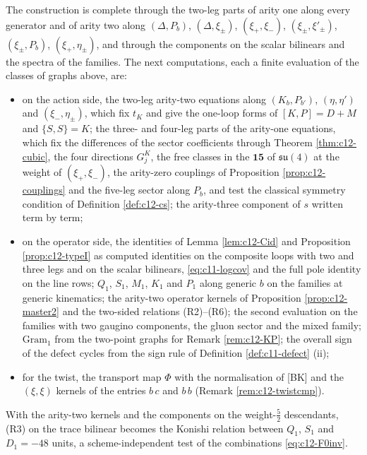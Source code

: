 \begin{remark}
\label{rem:c12-next}
The construction is complete through the two-leg parts of arity one along every generator and of arity two along $(\Delta,P_b)$, $(\Delta,\xi_\pm)$, $(\xi_+,\xi_-)$, $(\xi_\pm,\xi'_\pm)$, $(\xi_\pm,P_b)$, $(\xi_+,\eta_\pm)$, and through the components on the scalar bilinears and the spectra of the families. The next computations, each a finite evaluation of the classes of graphs above, are:
\begin{itemize}
\item on the action side, the two-leg arity-two equations along $(K_b,P_{b'})$, $(\eta,\eta')$ and $(\xi_-,\eta_\pm)$, which fix $t_K$ and give the one-loop forms of $[K,P]=D+M$ and $\{S,S\}=K$; the three- and four-leg parts of the arity-one equations, which fix the differences of the sector coefficients through Theorem \ref{thm:c12-cubic}, the four directions $G^K_j$, the free classes in the $\mathbf{15}$ of $\mathfrak{su}(4)$ at the weight of $(\xi_+,\xi_-)$, the arity-zero couplings of Proposition \ref{prop:c12-couplings} and the five-leg sector along $P_b$, and test the classical symmetry condition of Definition \ref{def:c12-cs}; the arity-three component of $s$ written term by term;
\item on the operator side, the identities of Lemma \ref{lem:c12-Cid} and Proposition \ref{prop:c12-typeI} as computed identities on the composite loops with two and three legs and on the scalar bilinears, \eqref{eq:c11-logcov} and the full pole identity on the line rows; $Q_1$, $S_1$, $M_1$, $K_1$ and $P_1$ along generic $b$ on the families at generic kinematics; the arity-two operator kernels of Proposition \ref{prop:c12-master2} and the two-sided relations (R2)--(R6); the second evaluation on the families with two gaugino components, the gluon sector and the mixed family; $\mathrm{Gram}_1$ from the two-point graphs for Remark \ref{rem:c12-KP}; the overall sign of the defect cycles from the sign rule of Definition \ref{def:c11-defect} (ii);
\item for the twist, the transport map $\Phi$ with the normalisation of [BK] and the $(\xi,\xi)$ kernels of the entries $b\,c$ and $b\,b$ (Remark \ref{rem:c12-twistcmp}).
\end{itemize}
With the arity-two kernels and the components on the weight-$\tfrac52$ descendants, (R3) on the trace bilinear becomes the Konishi relation between $Q_1$, $S_1$ and $D_1=-48$ units, a scheme-independent test of the combinations \eqref{eq:c12-F0inv}.
\end{remark}


